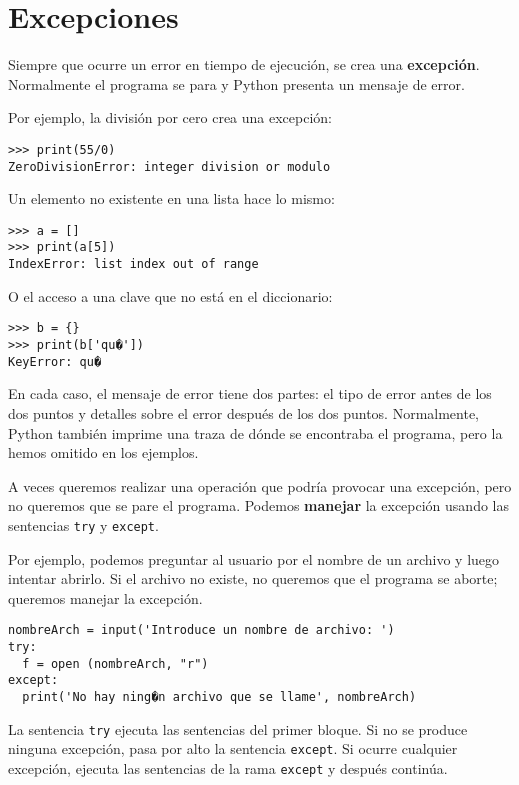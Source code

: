 \section{Excepciones}

  
  

Siempre que ocurre un error en tiempo de ejecución, se crea una \textbf{excepción}.
Normalmente el programa se para y Python presenta un mensaje de error.

Por ejemplo, la división por cero crea una excepción:
\begin{lstlisting}
>>> print(55/0)
ZeroDivisionError: integer division or modulo
\end{lstlisting}

Un elemento no existente en una lista hace lo mismo:
\begin{lstlisting}
>>> a = []
>>> print(a[5])
IndexError: list index out of range
\end{lstlisting}

O el acceso a una clave que no está en el diccionario:
\begin{lstlisting}
>>> b = {}
>>> print(b['qu�'])
KeyError: qu�
\end{lstlisting}

En cada caso, el mensaje de error tiene dos partes: el tipo de error
antes de los dos puntos y detalles sobre el error después de los dos
puntos. Normalmente, Python también imprime una traza de dónde se
encontraba el programa, pero la hemos omitido en los ejemplos.


A veces queremos realizar una operación que podría provocar una excepción,
pero no queremos que se pare el programa. Podemos \textbf{manejar}
la excepción usando las sentencias \texttt{try} y \texttt{except}.

Por ejemplo, podemos preguntar al usuario por el nombre de un archivo
y luego intentar abrirlo. Si el archivo no existe, no queremos que
el programa se aborte; queremos manejar la excepción.
\begin{lstlisting}
nombreArch = input('Introduce un nombre de archivo: ')
try:
  f = open (nombreArch, "r")
except:
  print('No hay ning�n archivo que se llame', nombreArch)
\end{lstlisting}

La sentencia \texttt{try} ejecuta las sentencias del primer bloque.
Si no se produce ninguna excepción, pasa por alto la sentencia \texttt{except}.
Si ocurre cualquier excepción, ejecuta las sentencias de la rama \texttt{except}
y después continúa.

